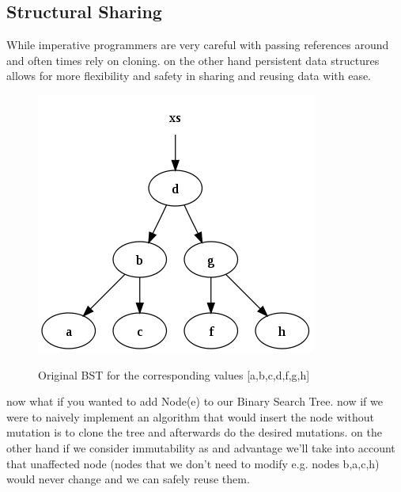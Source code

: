 \documentclass[12pt,twoside]{article}
\begin{document}
\subsection{Structural Sharing}
While imperative programmers are very careful with passing references around and often times rely on cloning. on the other hand persistent data structures allows for more flexibility and safety in sharing and reusing data with ease.
\begin{figure}[H]
    \begin{center}
        {\includegraphics[scale=.65]{originalTree.png}}
    \end{center}
    \caption{ \label{figure:1} Original BST for the corresponding values [a,b,c,d,f,g,h]}
\end{figure}
now what if you wanted to add Node(e) to our Binary Search Tree. now if we were to naively implement an algorithm that would insert the node without mutation is to clone the tree and afterwards do the desired mutations. on the other hand if we consider immutability as and advantage we'll take into account that unaffected node (nodes that we don't need to modify e.g. nodes b,a,c,h) would never change and we can safely reuse them.
\end{document}
